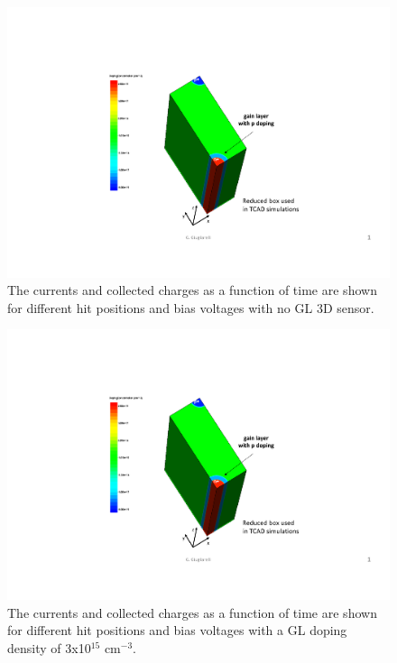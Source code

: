 \documentclass[aps,pt14,superscriptaddress,showpacs,floatfix,nofootinbib]{revtex4}
\begin{document}
\begin{figure}[hbtp]
\begin{center}
\includegraphics[page=6,width=0.5\textheight,keepaspectratio]{figures/IBL-3DwithGainLayer_20190610_toWeiming.pdf}
\caption{The currents and collected charges as a function of time are shown for different 
hit positions and bias voltages with no GL 3D sensor.\label{fig:drift1}}  
\end{center}
\end{figure}

\begin{figure}[hbtp]
\begin{center}
\includegraphics[page=7,width=0.5\textheight,keepaspectratio]{figures/IBL-3DwithGainLayer_20190610_toWeiming.pdf}
\caption{The currents and collected charges as a function of time are shown for different
hit positions and bias voltages with a GL doping density of 3x10$^{15}$ cm$^{-3}$.\label{fig:drift2}}
\end{center}
\end{figure}
\end{document}
